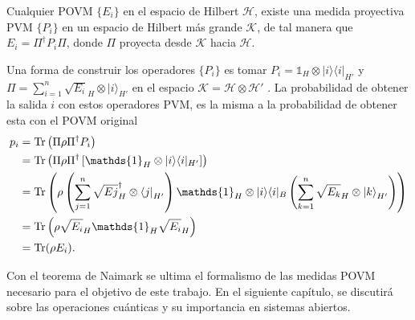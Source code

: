 \begin{theorem} 
Cualquier POVM $\{E_i\}$ en el espacio de Hilbert $\mathcal{H}$, existe una
medida proyectiva PVM $\{P_i\}$ en un espacio de Hilbert más grande
$\mathcal{K}$, de tal manera que $E_i=\Pi^\dagger P_i\Pi$, donde $\Pi$ proyecta
desde $\mathcal{K}$ hacia $\mathcal{H}$.
\end{theorem}
	

Una forma de construir los operadores $\{P_i\}$ es tomar  $P _{i}=\mathds{1} _{H}\otimes
|i\rangle \langle i|_{H'}$ y
$\Pi=\sum _{i=1}^{n}{\sqrt {E_{i}} }_{H}\otimes {|i\rangle }_{H'}$ en el espacio $\mathcal{K}=\mathcal{H}\otimes\mathcal{H'}$ . La
probabilidad de obtener la salida $i$ con estos operadores PVM, es la misma a
la probabilidad de obtener esta con el POVM original {\cite{2007geometry}}
\begin{equation}
 \begin{split}
 p_i&=\tr \left(\Pi\rho\Pi^{\dagger }P _{i}\right)\\
 &=\tr \left(\Pi\rho \Pi^{\dagger }\left[\mathds{1}_{H}\otimes |i\rangle \langle i|_{H'}\right]\right)\\
 &=\tr \left(\rho\left(\sum _{j=1}^{n}{\sqrt {E{j} }}_{H}^{\dagger }\otimes {\langle j|}_{H'}\right)\mathds{1} _{H}\otimes |i\rangle \langle i|_{B}\left(\sum _{k=1}^{n}{\sqrt {E_{k} }}_{H}\otimes {|k\rangle }_{H'}\right)\right)\\
 &=\tr \left(\rho {\sqrt {E_{i} }}_{H}\mathds{1} _{H}{\sqrt {E_{i} }}_{H}\right)\\
 &=\tr (\rho E_{i}).
 \end{split}
\end{equation}

Con el teorema de Naimark  se ultima el formalismo de las medidas POVM necesario para el objetivo de este trabajo. En el siguiente capítulo, se discutirá sobre las operaciones cuánticas y su importancia en sistemas abiertos.


